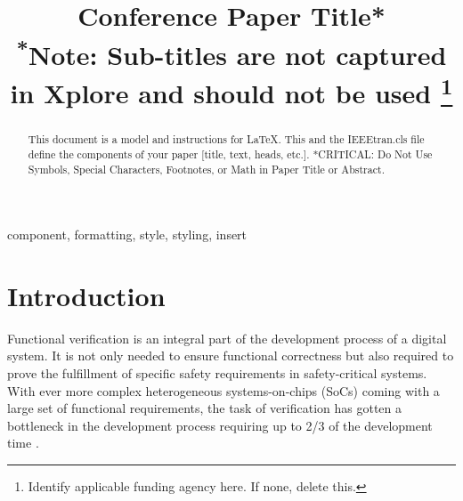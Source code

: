 \documentclass[conference]{IEEEtran}
\begin{document}
\title{Conference Paper Title*\\
{\footnotesize \textsuperscript{*}Note: Sub-titles are not captured in Xplore and
should not be used}
\thanks{Identify applicable funding agency here. If none, delete this.}
}

\author{
\and
{}
\and
{}
}

\maketitle

\begin{abstract}
This document is a model and instructions for \LaTeX.
This and the IEEEtran.cls file define the components of your paper [title, text, heads, etc.]. *CRITICAL: Do Not Use Symbols, Special Characters, Footnotes, 
or Math in Paper Title or Abstract.
\end{abstract}

\begin{IEEEkeywords}
component, formatting, style, styling, insert
\end{IEEEkeywords}

\section{Introduction}

Functional verification is an integral part of the development process of a digital system. It is not only needed to ensure functional correctness but also required to prove the fulfillment of specific safety requirements in safety-critical systems. 
With ever more complex heterogeneous systems-on-chips (SoCs) coming with a large set of functional requirements, the task of verification has gotten a bottleneck in the development process requiring up to 2/3 of the development time \cite{bergeron2012writing}.
\end{document}

